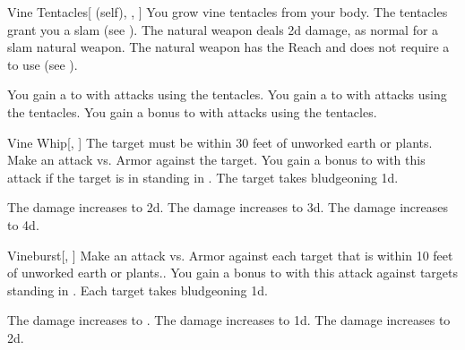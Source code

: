 \lowercase{\hypertarget{spell:Vine Tentacles}{}}\label{spell:Vine Tentacles}
\begin{attuneability}[Rank 1]{\hypertarget{spell:Vine Tentacles}{Vine Tentacles}}[ (self), , ]
You grow vine tentacles from your body.
The tentacles grant you a slam  (see ).
The natural weapon deals \plus2d damage, as normal for a slam natural weapon.
The natural weapon has the Reach  and does not require a  to use (see ).

\rankline
{} You gain a   to  with attacks using the tentacles.
 You gain a   to  with attacks using the tentacles.
 You gain a  bonus to  with attacks using the tentacles.
\end{attuneability}
\vspace{0.25em}



\lowercase{\hypertarget{spell:Vine Whip}{}}\label{spell:Vine Whip}
\begin{freeability}[Rank 1]{\hypertarget{spell:Vine Whip}{Vine Whip}}[, ]
The target must be within 30 feet of unworked earth or plants.
Make an attack vs. Armor against the target.
You gain a  bonus to  with this attack if the target is in standing in .
\hit The target takes bludgeoning  \plus1d.

\rankline
{} The damage increases to  \plus2d.
 The damage increases to  \plus3d.
 The damage increases to  \plus4d.
\end{freeability}
\vspace{0.25em}



\lowercase{\hypertarget{spell:Vineburst}{}}\label{spell:Vineburst}
\begin{freeability}[Rank 1]{\hypertarget{spell:Vineburst}{Vineburst}}[, ]
Make an attack vs. Armor against each target that is within 10 feet of unworked earth or plants..
You gain a  bonus to  with this attack against targets standing in .
\hit Each target takes bludgeoning  \minus1d.

\rankline
{} The damage increases to .
 The damage increases to  \plus1d.
 The damage increases to  \plus2d.
\end{freeability}
\vspace{0.25em}



